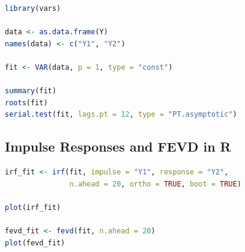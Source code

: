 \documentclass[12pt,oneside]{book}
\numberwithin{equation}{section}
\theoremstyle{definition}
\theoremstyle{plain}
\theoremstyle{remark}
\begin{document}
\begin{lstlisting}[language=R, caption={Fitting a VAR model in R}]
library(vars)

data <- as.data.frame(Y)
names(data) <- c("Y1", "Y2")

fit <- VAR(data, p = 1, type = "const")

summary(fit)
roots(fit)
serial.test(fit, lags.pt = 12, type = "PT.asymptotic")
\end{lstlisting}

\subsection{Impulse Responses and FEVD in R}

\begin{lstlisting}[language=R, caption={Impulse responses and FEVD in R}]
irf_fit <- irf(fit, impulse = "Y1", response = "Y2",
               n.ahead = 20, ortho = TRUE, boot = TRUE)

plot(irf_fit)

fevd_fit <- fevd(fit, n.ahead = 20)
plot(fevd_fit)
\end{lstlisting}
\end{document}
